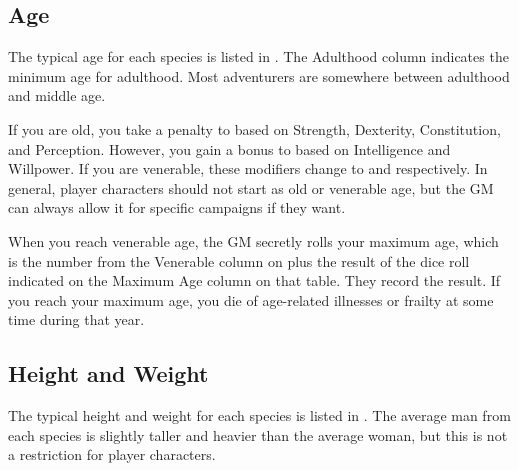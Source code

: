    \subsection{Age}
        The typical age for each species is listed in .
        The Adulthood column indicates the minimum age for adulthood.
        Most adventurers are somewhere between adulthood and middle age.

        If you are old, you take a  penalty to  based on Strength, Dexterity, Constitution, and Perception.
        However, you gain a  bonus to  based on Intelligence and Willpower.
        If you are venerable, these modifiers change to  and  respectively.
        In general, player characters should not start as old or venerable age, but the GM can always allow it for specific campaigns if they want.

        When you reach venerable age, the GM secretly rolls your maximum age, which is the number from the Venerable column on  plus the result of the dice roll indicated on the Maximum Age column on that table.
        They record the result.
        If you reach your maximum age, you die of age-related illnesses or frailty at some time during that year.

    \subsection{Height and Weight}
        The typical height and weight for each species is listed in .
        The average man from each species is slightly taller and heavier than the average woman, but this is not a restriction for player characters.




